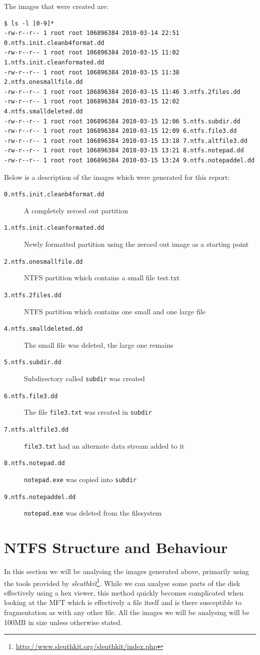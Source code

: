 \documentclass[a4paper,
    11pt,
    normalheadings,
    parindent,
    UKenglish,
    abstracton,
    ]{scrartcl}
\begin{document}
The images that were created are:
\begin{verbatim}
$ ls -l [0-9]*
-rw-r--r-- 1 root root 106896384 2010-03-14 22:51 0.ntfs.init.cleanb4format.dd
-rw-r--r-- 1 root root 106896384 2010-03-15 11:02 1.ntfs.init.cleanformated.dd
-rw-r--r-- 1 root root 106896384 2010-03-15 11:38 2.ntfs.onesmallfile.dd
-rw-r--r-- 1 root root 106896384 2010-03-15 11:46 3.ntfs.2files.dd
-rw-r--r-- 1 root root 106896384 2010-03-15 12:02 4.ntfs.smalldeleted.dd
-rw-r--r-- 1 root root 106896384 2010-03-15 12:06 5.ntfs.subdir.dd
-rw-r--r-- 1 root root 106896384 2010-03-15 12:09 6.ntfs.file3.dd
-rw-r--r-- 1 root root 106896384 2010-03-15 13:18 7.ntfs.altfile3.dd
-rw-r--r-- 1 root root 106896384 2010-03-15 13:21 8.ntfs.notepad.dd
-rw-r--r-- 1 root root 106896384 2010-03-15 13:24 9.ntfs.notepaddel.dd
\end{verbatim}

Below is a description of the images which were generated for this report:
\begin{description}
    \item[\texttt{0.ntfs.init.cleanb4format.dd}] A completely zeroed out partition
    \item[\texttt{1.ntfs.init.cleanformated.dd}] Newly formatted partition using the zeroed out image as a starting point
    \item[\texttt{2.ntfs.onesmallfile.dd }] NTFS partition which contains a small file test.txt
    \item[\texttt{3.ntfs.2files.dd}] NTFS partition which contains one small and one large file
    \item[\texttt{4.ntfs.smalldeleted.dd}] The small file was deleted, the large one remains
    \item[\texttt{5.ntfs.subdir.dd}] Subdirectory called \texttt{subdir} was created
    \item[\texttt{6.ntfs.file3.dd}] The file \texttt{file3.txt} was created in \texttt{subdir}
    \item[\texttt{7.ntfs.altfile3.dd}] \texttt{file3.txt} had an alternate data stream added to it
    \item[\texttt{8.ntfs.notepad.dd}] \texttt{notepad.exe} was copied into \texttt{subdir}
    \item[\texttt{9.ntfs.notepaddel.dd}] \texttt{notepad.exe} was deleted from the filesystem
\end{description}



\section{NTFS Structure and Behaviour}
In this section we will be analysing the images generated above, primarily using the tools provided by \emph{sleuthkit}\footnote{\url{http://www.sleuthkit.org/sleuthkit/index.php}}.
While we can analyse some parts of the disk effectively using a hex viewer, this method quickly becomes complicated when looking at the MFT which is effectively a file itself and is there susceptible to fragmentation as with any other file.
All the images we will be analysing will be 100MB in size unless otherwise stated.
\end{document}
